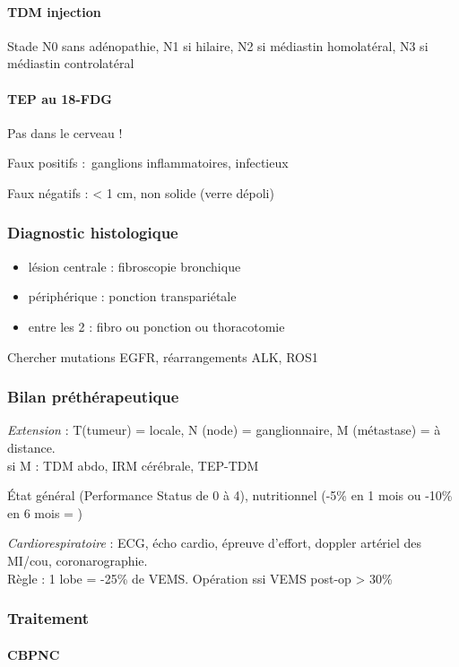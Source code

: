 \documentclass[11pt]{article}
\begin{document}
\paragraph{TDM injection}
\label{sec:orgf507a02}
Stade N0 sans adénopathie, N1 si hilaire, N2 si médiastin homolatéral, N3 si médiastin
controlatéral

\paragraph{TEP au 18-FDG}
\label{sec:org8389ada}
Pas dans le cerveau !

Faux positifs : ganglions inflammatoires, infectieux

Faux négatifs : < 1 cm, non solide (verre dépoli)

\subsubsection{Diagnostic histologique}
\label{sec:orga83b2fc}

\begin{itemize}
\item lésion centrale : fibroscopie bronchique
\item périphérique : ponction transpariétale
\item entre les 2 : fibro ou ponction ou thoracotomie
\end{itemize}

Chercher mutations EGFR, réarrangements ALK, ROS1

\subsubsection{Bilan préthérapeutique}
\label{sec:orgb2b2f8a}
\emph{Extension}  : T(tumeur) = locale, N (node) = ganglionnaire, M
(métastase) = à distance. \\
si M : TDM abdo, IRM cérébrale, TEP-TDM

État général (Performance Status de 0 à 4), nutritionnel (-5\% en 1 mois ou
-10\% en 6 mois = \frownie{})

\emph{Cardiorespiratoire} : ECG, écho cardio, épreuve d'effort, doppler artériel des MI/cou,
coronarographie.\\
Règle : 1 lobe = -25\% de VEMS. Opération ssi VEMS post-op > 30\%
\subsubsection{Traitement}
\label{sec:org265564f}
\paragraph{CBPNC}
\label{sec:org12c03a0}
\end{document}
